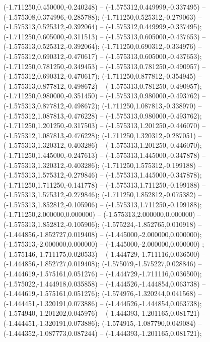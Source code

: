  (-1.711250,0.450000,-0.240248) -- (-1.575312,0.449999,-0.337495) -- (-1.575308,0.374996,-0.285788);
 (-1.711250,0.525312,-0.279063) -- (-1.575313,0.525312,-0.392064) -- (-1.575312,0.449999,-0.337495);
 (-1.711250,0.605000,-0.311513) -- (-1.575313,0.605000,-0.437653) -- (-1.575313,0.525312,-0.392064);
 (-1.711250,0.690312,-0.334976) -- (-1.575312,0.690312,-0.470617) -- (-1.575313,0.605000,-0.437653);
 (-1.711250,0.781250,-0.349453) -- (-1.575313,0.781250,-0.490957) -- (-1.575312,0.690312,-0.470617);
 (-1.711250,0.877812,-0.354945) -- (-1.575313,0.877812,-0.498672) -- (-1.575313,0.781250,-0.490957);
 (-1.711250,0.980000,-0.351450) -- (-1.575313,0.980000,-0.493762) -- (-1.575313,0.877812,-0.498672);
 (-1.711250,1.087813,-0.338970) -- (-1.575312,1.087813,-0.476228) -- (-1.575313,0.980000,-0.493762);
 (-1.711250,1.201250,-0.317503) -- (-1.575313,1.201250,-0.446070) -- (-1.575312,1.087813,-0.476228);
 (-1.711250,1.320312,-0.287051) -- (-1.575313,1.320312,-0.403286) -- (-1.575313,1.201250,-0.446070);
 (-1.711250,1.445000,-0.247613) -- (-1.575313,1.445000,-0.347878) -- (-1.575313,1.320312,-0.403286);
 (-1.711250,1.575312,-0.199188) -- (-1.575313,1.575312,-0.279846) -- (-1.575313,1.445000,-0.347878);
 (-1.711250,1.711250,-0.141778) -- (-1.575313,1.711250,-0.199188) -- (-1.575313,1.575312,-0.279846);
 (-1.711250,1.852812,-0.075382) -- (-1.575313,1.852812,-0.105906) -- (-1.575313,1.711250,-0.199188);
 (-1.711250,2.000000,0.000000) -- (-1.575313,2.000000,0.000000) -- (-1.575313,1.852812,-0.105906);
 (-1.575224,-1.852765,0.010918) -- (-1.444856,-1.852727,0.019408) -- (-1.445000,-2.000000,0.000000);
 (-1.575313,-2.000000,0.000000) -- (-1.445000,-2.000000,0.000000) ;
 (-1.575146,-1.711175,0.020533) -- (-1.444729,-1.711116,0.036500) -- (-1.444856,-1.852727,0.019408);
 (-1.575079,-1.575227,0.028846) -- (-1.444619,-1.575161,0.051276) -- (-1.444729,-1.711116,0.036500);
 (-1.575022,-1.444918,0.035858) -- (-1.444526,-1.444854,0.063738) -- (-1.444619,-1.575161,0.051276);
 (-1.574976,-1.320244,0.041568) -- (-1.444451,-1.320191,0.073886) -- (-1.444526,-1.444854,0.063738);
 (-1.574940,-1.201202,0.045976) -- (-1.444393,-1.201165,0.081721) -- (-1.444451,-1.320191,0.073886);
 (-1.574915,-1.087790,0.049084) -- (-1.444352,-1.087773,0.087244) -- (-1.444393,-1.201165,0.081721);
